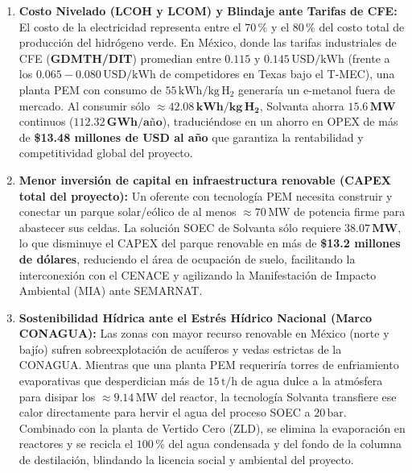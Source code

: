 \documentclass[11pt,a4paper]{article}
\begin{document}
\begin{enumerate}
    \item \textbf{Costo Nivelado (LCOH y LCOM) y Blindaje ante Tarifas de CFE:}  
    El costo de la electricidad representa entre el $70\,\%$ y el $80\,\%$ del costo total de producción del hidrógeno verde. En México, donde las tarifas industriales de CFE (\textbf{GDMTH/DIT}) promedian entre $0.115\text{ y }0.145\,\text{USD/kWh}$ (frente a los $0.065 - 0.080\,\text{USD/kWh}$ de competidores en Texas bajo el T-MEC), una planta PEM con consumo de $55\,\text{kWh/kg}\,\text{H}_2$ generaría un e-metanol fuera de mercado. Al consumir sólo $\approx \mathbf{42.08\,\text{kWh/kg}\,\text{H}_2}$, Solvanta ahorra $\mathbf{15.6\,\text{MW}}$ continuos ($\mathbf{112.32\,\text{GWh/año}}$), traduciéndose en un ahorro en OPEX de más de \textbf{\$13.48 millones de USD al año} que garantiza la rentabilidad y competitividad global del proyecto.
    
    \item \textbf{Menor inversión de capital en infraestructura renovable (CAPEX total del proyecto):}  
    Un oferente con tecnología PEM necesita construir y conectar un parque solar/eólico de al menos $\approx 70\,\text{MW}$ de potencia firme para abastecer sus celdas. La solución SOEC de Solvanta sólo requiere $\mathbf{38.07\,\text{MW}}$, lo que disminuye el CAPEX del parque renovable en más de \textbf{\$13.2 millones de dólares}, reduciendo el área de ocupación de suelo, facilitando la interconexión con el CENACE y agilizando la Manifestación de Impacto Ambiental (MIA) ante SEMARNAT.
    
    \item \textbf{Sostenibilidad Hídrica ante el Estrés Hídrico Nacional (Marco CONAGUA):}  
    Las zonas con mayor recurso renovable en México (norte y bajío) sufren sobreexplotación de acuíferos y vedas estrictas de la CONAGUA. Mientras que una planta PEM requeriría torres de enfriamiento evaporativas que desperdician más de $15\,\text{t/h}$ de agua dulce a la atmósfera para disipar los $\approx 9.14\,\text{MW}$ del reactor, la tecnología Solvanta transfiere ese calor directamente para hervir el agua del proceso SOEC a $20\,\text{bar}$. Combinado con la planta de Vertido Cero (ZLD), se elimina la evaporación en reactores y se recicla el $100\,\%$ del agua condensada y del fondo de la columna de destilación, blindando la licencia social y ambiental del proyecto.
\end{enumerate}
\end{document}
